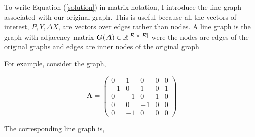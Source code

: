 \documentclass[american]{scrartcl}
\newcommand{\R}{\mathbb{R}}
\newcommand{\matr}[1]{\bm{#1}}
\DeclarePairedDelimiter\abs{\lvert}{\rvert}%
\begin{document}

To write Equation (\ref{solution}) in matrix notation, I introduce the line graph associated with our original graph. This is useful because all the vectors of interest, $P, Y, \Delta X$, are vectors over edges rather than nodes. A line graph is the graph with adjacency matrix $\matr{G}(\matr{A}) \in \R^{\abs{E} \times \abs{E}}$ were the nodes are edges of the original graphs and edges are inner nodes of the original graph

For example, consider the graph,

\vspace{0.5em}
\begin{minipage}{0.6\textwidth}
\end{minipage} \hfill
\begin{minipage}{0.35\textwidth}
	\begin{equation*}
		\matr{A} = \begin{pmatrix}
			0  & 1  & 0  & 0 & 0 \\
			-1 & 0  & 1  & 0 & 1 \\
			0  & -1 & 0  & 1 & 0 \\
			0  & 0  & -1 & 0 & 0 \\
			0  & -1 & 0  & 0 & 0
		\end{pmatrix}
	\end{equation*}
\end{minipage}


The corresponding line graph is,
\end{document}
